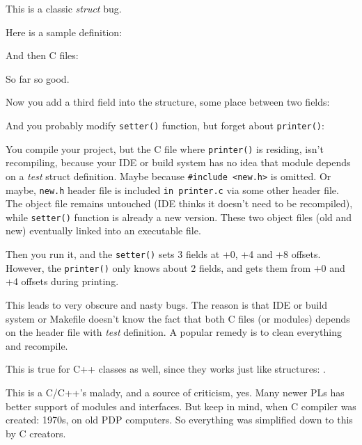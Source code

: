 
This is a classic \emph{struct} bug.

Here is a sample definition:



And then C files:





So far so good.

Now you add a third field into the structure, some place between two fields:



And you probably modify \verb|setter()| function, but forget about \verb|printer()|:



You compile your project, but the C file where \verb|printer()| is residing, isn't recompiling,
because your \ac{IDE} or build system
has no idea that module depends on a \emph{test} struct definition.
Maybe because \verb|#include <new.h>| is omitted.
Or maybe, \verb|new.h| header file is included \verb|in printer.c| via some other header file.
The object file remains untouched (\ac{IDE} thinks it doesn't need to be recompiled),
while \verb|setter()| function is already a new version.
These two object files (old and new) eventually linked into an executable file.

Then you run it, and the \verb|setter()| sets 3 fields at +0, +4 and +8 offsets.
However, the \verb|printer()| only knows about 2 fields, and gets them from +0 and +4 offsets during printing.

This leads to very obscure and nasty bugs.
The reason is that \ac{IDE} or build system or Makefile doesn't know the fact that both C files (or modules) depends on the header
file with \emph{test} definition.
A popular remedy is to clean everything and recompile.

This is true for C++ classes as well, since they works just like structures: .

This is a C/C++'s malady, and a source of criticism, yes.
Many newer \ac{PL}s has better support of modules and interfaces.
But keep in mind, when C compiler was created: 1970s, on old PDP computers.
So everything was simplified down to this by C creators.

